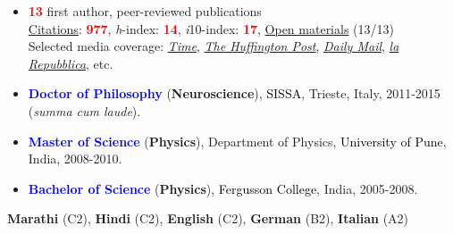 \documentclass[10pt]{article}
\begin{document}
	\begin{itemize}
	\item \textbf{\textcolor{red}{13}} first author, peer-reviewed publications\\
	
	\href{https://scholar.google.it/citations?user=kSYuYTUAAAAJ&hl=en&oi=ao}{Citations}: \textbf{\textcolor{red}{977}}, \textit{h}-index: \textbf{\textcolor{red}{14}}, \textit{i}10-index: \textbf{\textcolor{red}{17}}, \href{https://osf.io/hk5f3/}{Open materials} (13/13)\\
	
	Selected media coverage: \href{http://time.com/3242/driving-over-your-best-friend-its-the-right-thing-to-do/}{\textit{Time}}, \href{http://www.huffingtonpost.com/entry/autism-empathy-brain-research_us_56f92575e4b014d3fe237413}{\textit{The Huffington Post}}, \href{http://www.dailymail.co.uk/sciencetech/article-4308284/Virtual-reality-experiment-puts-altruism-test.html}{\textit{Daily Mail}}, \href{http://www.repubblica.it/scienze/2017/04/11/news/area_cervello_perdono-162669836/?rss}{\textit{la Repubblica}}, etc.
	
     \end{itemize}

	
	\begin{itemize}	
	
	\itemsep-0.1em
	\item \textbf{\textcolor{blue}{Doctor of Philosophy}} (\textbf{Neuroscience}), \textcolor{black}{SISSA}, Trieste, Italy, 2011-2015 (\textit{summa cum laude}).

	\item \textbf{\textcolor{blue}{Master of Science}} (\textbf{Physics}), Department of Physics, \textcolor{black}{University of Pune}, India, 2008-2010.%
	
	\item \textbf{\textcolor{blue}{Bachelor of Science}} (\textbf{Physics}), \textcolor{black}{Fergusson College}, India, 2005-2008.%

    \end{itemize}

	\textbf{Marathi} (C2), \textbf{Hindi} (C2), \textbf{English} (C2), \textbf{German} (B2), \textbf{Italian} (A2)
	
\end{document}
